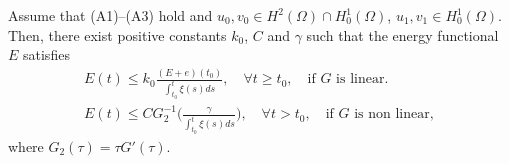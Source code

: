 \begin{theorem} \label{thm13}
Assume that {\rm (A1)--(A3)} hold and $u_0,v_0 \in H^2(\Omega) \cap H^1_0(\Omega)$,
$u_1,v_1 \in H^1_0(\Omega)$. Then, there exist positive constants $k_0$, $C$ and
$\gamma$ such that the energy functional $E$ satisfies
\begin{gather}
E(t) \leq k_0 \frac{\left( E + e \right)(t_0)}{\int_{t_0}^t\xi(s)ds},\quad
\forall t\geq t_0, \quad  \text{if $G$ is linear.} \label{e4.24}\\
E(t)\leq C G_2^{-1}\Big( \frac{\gamma}{\int_{t_0}^t \xi(s)ds}\Big), \quad
 \forall t>t_0, \quad \text{if $G$ is non linear}, \label{e4.25}
\end{gather}
where $ G_2(\tau ) = \tau G'(\tau )$.
\end{theorem}
